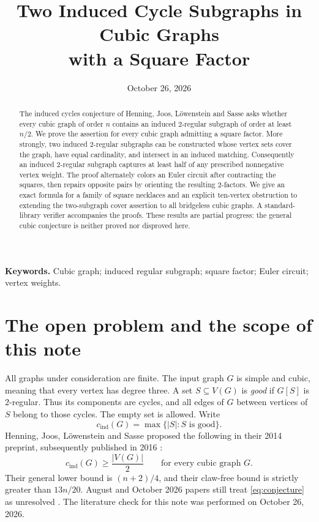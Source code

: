 \documentclass[11pt]{article}
\title{Two Induced Cycle Subgraphs in Cubic Graphs\\with a Square Factor}
\author{}
\date{October 26, 2026}
\newcommand{\cind}{c_{\mathrm{ind}}}
\begin{document}
\maketitle
\begin{abstract}
The induced cycles conjecture of Henning, Joos, L\"owenstein and Sasse
asks whether every cubic graph of order $n$ contains an induced
$2$-regular subgraph of order at least $n/2$.
We prove the assertion for every cubic graph admitting a square factor.
More strongly, two induced $2$-regular subgraphs can be constructed whose
vertex sets cover the graph, have equal cardinality, and intersect in an
induced matching. Consequently an induced $2$-regular subgraph captures
at least half of any prescribed nonnegative vertex weight.
The proof alternately colors an Euler circuit after contracting the
squares, then repairs opposite pairs by orienting the resulting
$2$-factors. We give an exact formula for a family of square necklaces
and an explicit ten-vertex obstruction to extending the two-subgraph
cover assertion to all bridgeless cubic graphs.
A standard-library verifier accompanies the proofs.
These results are partial progress: the general cubic conjecture
is neither proved nor disproved here.
\end{abstract}
\noindent\textbf{Keywords.} Cubic graph; induced regular subgraph;
square factor; Euler circuit; vertex weights.

\section{The open problem and the scope of this note}
All graphs under consideration are finite. The input graph $G$ is simple
and cubic, meaning that every vertex has degree three.
A set $S\subseteq V(G)$ is \emph{good} if $G[S]$ is $2$-regular.
Thus its components are cycles, and all edges of $G$ between vertices
of $S$ belong to those cycles. The empty set is allowed. Write
\[
 \cind(G)=\max\{|S|: S\text{ is good}\}.
\]
Henning, Joos, L\"owenstein and Sasse proposed the following in their
2014 preprint, subsequently published in 2016 \cite{HJLS}:
\begin{equation}\label{eq:conjecture}
 \cind(G)\geq \frac{|V(G)|}{2}\qquad\text{for every cubic graph }G.
\end{equation}
Their general lower bound is $(n+2)/4$, and their claw-free bound is
strictly greater than $13n/20$.
August and October 2026 papers still treat \eqref{eq:conjecture} as
unresolved \cite{KSS,RRT}. The literature check for this note was
performed on October 26, 2026.
\end{document}
